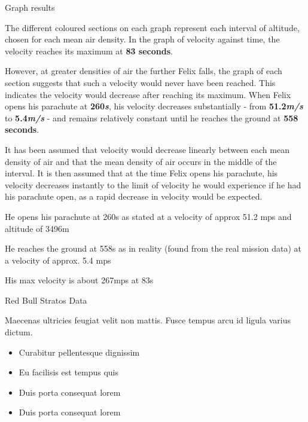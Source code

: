 \documentclass[final]{beamer}
\newlength{\onecolwid}
\begin{document}
\begin{frame}
\begin{columns}[t]
\begin{column}{\onecolwid} %


\begin{exampleblock}{Graph results}

The different coloured sections on each graph represent each interval of altitude, chosen for each mean air density. In the graph of velocity against time, the velocity reaches its maximum at \textbf{83 seconds}.\par However, at greater densities of air the further Felix falls, the graph of each section suggests that such a velocity would never have been reached. This indicates the velocity would decrease after reaching its maximum. When Felix opens his parachute at \textbf{260\textit{s}}, his velocity decreases substantially - from \textbf{51.2\textit{m/s}} to \textbf{5.4\textit{m/s}} - and remains relatively constant until he reaches the ground at \textbf{558 seconds}.

It has been assumed that velocity would decrease linearly between each mean density of air and that the mean density of air occurs in the middle of the interval. It is then assumed that at the time Felix opens his parachute, his velocity decreases instantly to the limit of velocity he would experience if he had his parachute open, as a rapid decrease in velocity would be expected.


He opens his parachute at 260s as stated at a velocity of approx 51.2 mps and altitude of 3496m

He reaches the ground at 558s as in reality (found from the real mission data) at a velocity of approx. 5.4 mps

His max velocity is about 267mps at 83s

\end{exampleblock}


\begin{exampleblock}{Red Bull Stratos Data}

Maecenas ultricies feugiat velit non mattis. Fusce tempus arcu id ligula varius dictum. 
\begin{itemize}
\item Curabitur pellentesque dignissim
\item Eu facilisis est tempus quis
\item Duis porta consequat lorem
\item Duis porta consequat lorem
\end{itemize}


\end{exampleblock}
\end{column}
\end{columns}
\end{frame}
\end{document}
